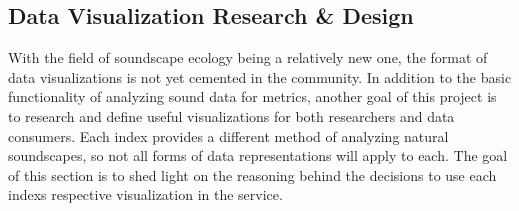 \subsection{Data Visualization Research \& Design}
With the field of soundscape ecology being a relatively new one, the format of data visualizations is not yet cemented in the community. In addition to the basic functionality of analyzing sound data for metrics, another goal of this project is to research and define useful visualizations for both researchers and data consumers. Each index provides a different method of analyzing natural soundscapes, so not all forms of data representations will apply to each. The goal of this section is to shed light on the reasoning behind the decisions to use each index\textquotesingle s respective visualization in the service.









